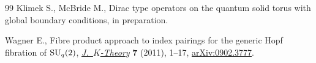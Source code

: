 \documentclass[11pt]{article}
\numberwithin{equation}{section}
\begin{document}
\begin{thebibliography}{99}
Klimek S., McBride M., Dirac type operators on the quantum solid torus with
  global boundary conditions, {i}n preparation.

Wagner E., Fibre product approach to index pairings for the generic {H}opf
  f\/ibration of {${\rm SU}_q(2)$}, \href{http://dx.doi.org/10.1017/is010002019jkt110}{\textit{J.~$K$-Theory}} \textbf{7} (2011),
  1--17, \href{http://arxiv.org/abs/0902.3777}{arXiv:0902.3777}.

\end{thebibliography}
\end{document}
